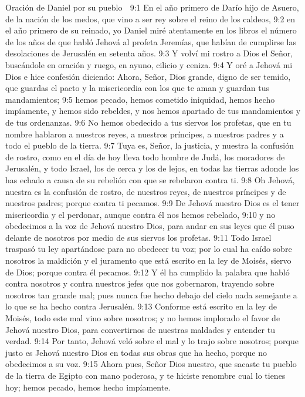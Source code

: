Oración de Daniel por su pueblo  

9:1 En el año primero de Darío hijo de Asuero, de la nación de los medos, que vino a ser rey sobre el reino de los caldeos,  
9:2 en el año primero de su reinado, yo Daniel miré atentamente en los libros el número de los años de que habló Jehová al profeta Jeremías, que habían de cumplirse las desolaciones de Jerusalén en setenta años. 
9:3 Y volví mi rostro a Dios el Señor, buscándole en oración y ruego, en ayuno, cilicio y ceniza.  
9:4 Y oré a Jehová mi Dios e hice confesión diciendo: Ahora, Señor, Dios grande, digno de ser temido, que guardas el pacto y la misericordia con los que te aman y guardan tus mandamientos;  
9:5 hemos pecado, hemos cometido iniquidad, hemos hecho impíamente, y hemos sido rebeldes, y nos hemos apartado de tus mandamientos y de tus ordenanzas.  
9:6 No hemos obedecido a tus siervos los profetas, que en tu nombre hablaron a nuestros reyes, a nuestros príncipes, a nuestros padres y a todo el pueblo de la tierra.  
9:7 Tuya es, Señor, la justicia, y nuestra la confusión de rostro, como en el día de hoy lleva todo hombre de Judá, los moradores de Jerusalén, y todo Israel, los de cerca y los de lejos, en todas las tierras adonde los has echado a causa de su rebelión con que se rebelaron contra ti.  
9:8 Oh Jehová, nuestra es la confusión de rostro, de nuestros reyes, de nuestros príncipes y de nuestros padres; porque contra ti pecamos.  
9:9 De Jehová nuestro Dios es el tener misericordia y el perdonar, aunque contra él nos hemos rebelado,  
9:10 y no obedecimos a la voz de Jehová nuestro Dios, para andar en sus leyes que él puso delante de nosotros por medio de sus siervos los profetas.  
9:11 Todo Israel traspasó tu ley apartándose para no obedecer tu voz; por lo cual ha caído sobre nosotros la maldición y el juramento que está escrito en la ley de Moisés, siervo de Dios; porque contra él pecamos.  
9:12 Y él ha cumplido la palabra que habló contra nosotros y contra nuestros jefes que nos gobernaron, trayendo sobre nosotros tan grande mal; pues nunca fue hecho debajo del cielo nada semejante a lo que se ha hecho contra Jerusalén.  
9:13 Conforme está escrito en la ley de Moisés, todo este mal vino sobre nosotros; y no hemos implorado el favor de Jehová nuestro Dios, para convertirnos de nuestras maldades y entender tu verdad.  
9:14 Por tanto, Jehová veló sobre el mal y lo trajo sobre nosotros; porque justo es Jehová nuestro Dios en todas sus obras que ha hecho, porque no obedecimos a su voz.  
9:15 Ahora pues, Señor Dios nuestro, que sacaste tu pueblo de la tierra de Egipto con mano poderosa, y te hiciste renombre cual lo tienes hoy; hemos pecado, hemos hecho impíamente.  
